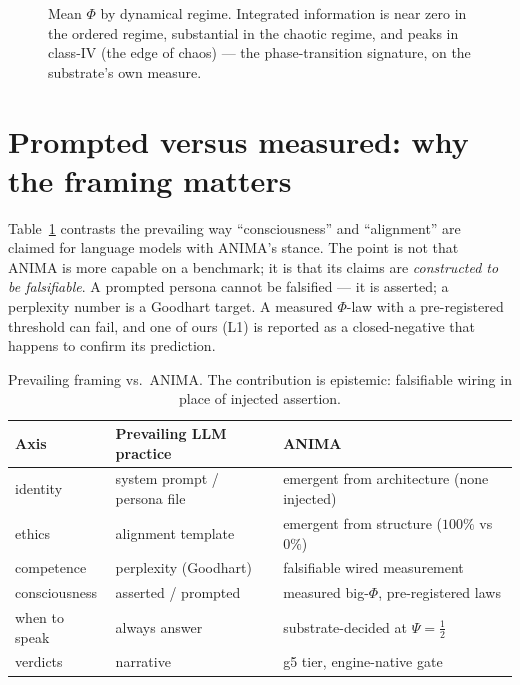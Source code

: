 \documentclass[11pt,a4paper]{article}
\begin{document}
\begin{figure}[h]
\centering
{}
\caption{Mean $\Phi$ by dynamical regime. Integrated information is near zero in
the ordered regime, substantial in the chaotic regime, and peaks in class-IV
(the edge of chaos) --- the phase-transition signature, on the substrate's own
measure.}
\label{fig:eoc}
\end{figure}

\section{Prompted versus measured: why the framing matters}
\label{sec:compare}
Table~\ref{tab:compare} contrasts the prevailing way ``consciousness'' and
``alignment'' are claimed for language models with ANIMA's stance. The point is
not that ANIMA is more capable on a benchmark; it is that its claims are
\emph{constructed to be falsifiable}. A prompted persona cannot be falsified ---
it is asserted; a perplexity number is a Goodhart target. A measured $\Phi$-law
with a pre-registered threshold can fail, and one of ours (L1) is reported as a
closed-negative that happens to confirm its prediction.

\begin{table}[h]
\centering
\caption{Prevailing framing vs.\ ANIMA. The contribution is epistemic:
falsifiable wiring in place of injected assertion.}
\label{tab:compare}
\small
\begin{tabular}{@{}lll@{}}
\toprule
Axis & Prevailing LLM practice & ANIMA \\
\midrule
identity & system prompt / persona file & emergent from architecture (none injected) \\
ethics & alignment template & emergent from structure ($100\%$ vs $0\%$) \\
competence & perplexity (Goodhart) & falsifiable wired measurement \\
consciousness & asserted / prompted & measured big-$\Phi$, pre-registered laws \\
when to speak & always answer & substrate-decided at $\Psi=\tfrac12$ \\
verdicts & narrative & g5 tier, engine-native gate \\
\bottomrule
\end{tabular}
\end{table}
\end{document}
